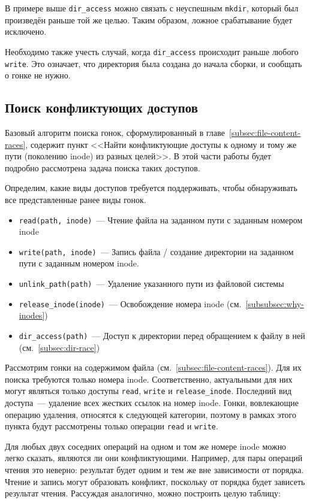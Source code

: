 В примере выше \texttt{dir\_access} можно связать с неуспешным \texttt{mkdir}, который был произведён раньше той же целью. Таким образом, ложное срабатывание будет исключено.

Необходимо также учесть случай, когда \texttt{dir\_access} происходит раньше любого \texttt{write}. Это означает, что директория была создана до начала сборки, и сообщать о гонке не нужно.

\subsection{Поиск конфликтующих доступов}
\label{subsec:cricital-accesses}

Базовый алгоритм поиска гонок, сформулированный в главе~\ref{subsec:file-content-races}, содержит пункт <<Найти конфликтующие доступы к одному и тому же пути (поколению inode) из разных целей>>. В этой части работы будет подробно рассмотрена задача поиска таких доступов.

Определим, какие виды доступов требуется поддерживать, чтобы обнаруживать все представленные ранее виды гонок.

\begin{itemize}
    \item \texttt{read(path, inode)}~--- Чтение файла на заданном пути с заданным номером inode
    \item \texttt{write(path, inode)}~--- Запись файла / создание директории на заданном пути с заданным номером inode.
    \item \texttt{unlink\_path(path)}~--- Удаление указанного пути из файловой системы
    \item \texttt{release\_inode(inode)}~--- Освобождение номера inode (см.~\ref{subsubsec:why-inodes})
    \item \texttt{dir\_access(path)}~--- Доступ к директории перед обращением к файлу в ней (см.~\ref{subsec:dir-race})
\end{itemize}

Рассмотрим гонки на содержимом файла (см.~\ref{subsec:file-content-races}). Для их поиска требуются только номера inode. Соответственно, актуальными для них могут являться только доступы \texttt{read}, \texttt{write} и \texttt{release\_inode}. Последний вид доступа~--- удаление всех жестких ссылок на номер inode. Гонки, вовлекающие операцию удаления, относятся к следующей категории, поэтому в рамках этого пункта будут рассмотрены только операции \texttt{read} и \texttt{write}.

Для любых двух соседних операций на одном и том же номере inode можно легко сказать, являются ли они конфликтующими. Например, для пары операций чтения это неверно: результат будет одним и тем же вне зависимости от порядка. Чтение и запись могут образовать конфликт, поскольку от порядка будет зависеть результат чтения. Рассуждая аналогично, можно построить целую таблицу:

